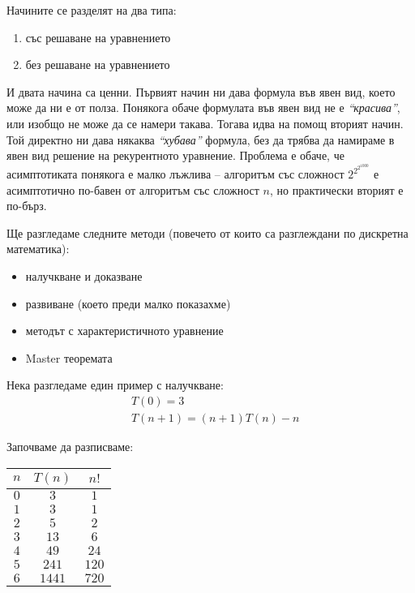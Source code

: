\documentclass{article}
\theoremstyle{definition}
\theoremstyle{plain}
\theoremstyle{remark}
\theoremstyle{definition}
\begin{document}
Начините се разделят на два типа:
\begin{enumerate}
    \item със решаване на уравнението
    \item без решаване на уравнението
\end{enumerate}

И двата начина са ценни.
Първият начин ни дава формула във явен вид, което може да ни е от полза.
Понякога обаче формулата във явен вид не е \textit{``красива''}, или изобщо не може да се намери такава.
Тогава идва на помощ вторият начин.
Той директно ни дава някаква \textit{``хубава''} формула, без да трябва да намираме в явен вид решение на рекурентното уравнение.
Проблема е обаче, че асимптотиката понякога е малко лъжлива -- алгоритъм със сложност $2^{2^{2^{1000}}}$ е асимптотично по-бавен от алгоритъм със сложност $n$, но практически вторият е по-бърз.

\pagebreak

Ще разгледаме следните методи (повечето от които са разглеждани по дискретна математика):
\begin{itemize}
    \item налучкване и доказване
    \item развиване (което преди малко показахме)
    \item методът с характеристичното уравнение
    \item Master теоремата
\end{itemize}

Нека разгледаме един пример с налучкване:
\begin{align*}
     & T(0) = 3                   \\
     & T(n + 1) = (n + 1)T(n) - n
\end{align*}

Започваме да разписваме:
\begin{center}
    \begin{tabular}{| c | c | c |}
        \hline
        $n$ & $T(n)$ & $n!$  \\
        \hline
        $0$ & $3$    & $1$   \\
        \hline
        $1$ & $3$    & $1$   \\
        \hline
        $2$ & $5$    & $2$   \\
        \hline
        $3$ & $13$   & $6$   \\
        \hline
        $4$ & $49$   & $24$  \\
        \hline
        $5$ & $241$  & $120$ \\
        \hline
        $6$ & $1441$ & $720$ \\
        \hline
    \end{tabular}
\end{center}
\end{document}
